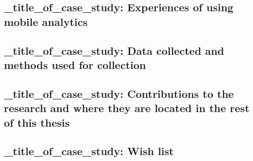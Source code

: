 \subsection{_title_of_case_study: Experiences of using mobile analytics}

\subsection{_title_of_case_study: Data collected and methods used for collection}

\subsection{_title_of_case_study: Contributions to the research and where they are located in the rest of this thesis}

\subsection*{_title_of_case_study: Wish list}

\clearpage